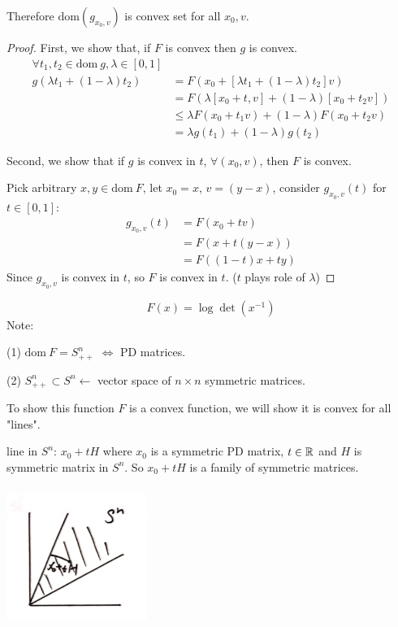 Therefore $\text{dom}(g_{x_0, v})$ is convex set for all $x_0, v$.\\

\begin{proof}
	
First, we show that, if $F$ is convex then $g$ is convex. 
\begin{align*}
\forall t_1, t_2\in \text{dom}\ g, \lambda\in [0,1]\\
g(\lambda t_1 +(1-\lambda)t_2) &= F(x_0+[\lambda t_1+(1-\lambda)t_2]v)\\
&= F(\lambda[x_0 +t, v]+(1-\lambda)[x_0+t_2v])\\
&\leq \lambda F(x_0+t_1 v)+(1-\lambda)F(x_0+t_2v)\\
&=\lambda g(t_1) + (1-\lambda)g(t_2)
\end{align*}

Second, we show that if $g$ is convex in $t$, $\forall(x_0, v)$, then $F$ is convex. 

Pick arbitrary $x,y\in \text{dom}\ F$, let $x_0 =x$, $v=(y-x)$, consider $g_{x_0, v}(t)$ for $t\in[0,1]$:
\begin{align*}
g_{x_0, v}(t) &= F(x_0+tv)\\
&= F(x+t(y-x))\\
&= F((1-t)x+ty)
\end{align*}
Since $g_{x_0, v}$ is convex in $t$, so $F$ is convex in $t$. ($t$ plays role of $\lambda$)

\end{proof}




\begin{example}
\begin{equation*}
F(x) =\log\det (x^{-1})
\end{equation*}
Note:

(1) $\text{dom}\ F = S^n_{++}$ $\Leftrightarrow$ PD matrices.

(2) $S^n_{++} \subset S^n \leftarrow$ vector space of $n\times n$ symmetric matrices. 

To show this function $F$ is a convex function, we will show it is convex for all "lines".

line in $S^n$: $x_0 + tH$ where $x_0$ is a symmetric PD matrix, $t\in \mathbb{R}$ and $H$ is symmetric matrix in $S^n$. So $x_0 + tH$ is a family of symmetric matrices.

\begin{marginfigure}
	\centering
	\includegraphics[width=1.8in,height=1.8in]{figures/ch08/figure1104_3.png}
\end{marginfigure}
\end{example}

